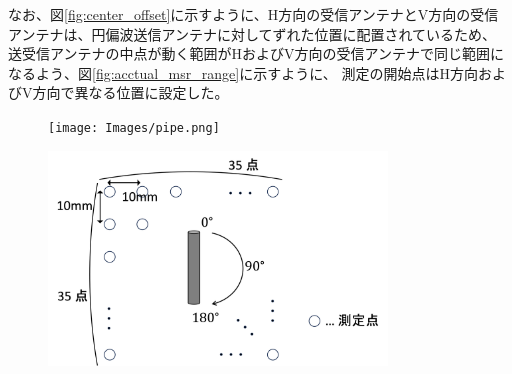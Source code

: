 \documentclass[11pt,a4paper,uplatex]{ujarticle}
\begin{document}
  なお、図\ref{fig:center_offset}に示すように、H方向の受信アンテナとV方向の受信アンテナは、円偏波送信アンテナに対してずれた位置に配置されているため、
  送受信アンテナの中点が動く範囲がHおよびV方向の受信アンテナで同じ範囲になるよう、図\ref{fig:acctual_msr_range}に示すように、
  測定の開始点はH方向およびV方向で異なる位置に設定した。


  \begin{figure}[tbp]
    \begin{minipage}{0.4\textwidth}
      \centering
      \texttt{[image: Images/pipe.png]}
      \label{fig:pipe}
    \end{minipage}
    \begin{minipage}{0.6\textwidth}
      \centering
      \includegraphics[keepaspectratio, width=90mm]{Images/msr_cond.png}
      \label{fig:msr_cond}
    \end{minipage}
  \end{figure}
\end{document}
